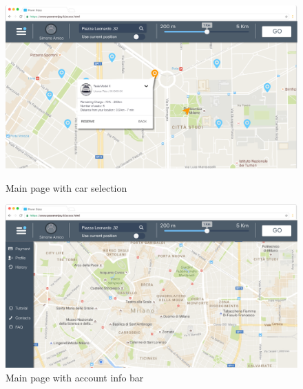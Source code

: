 \documentclass[12pt]{article}
\begin{document}
 	 	\begin{figure}
 	 	 \centering
 	 	 \includegraphics[scale=0.28]{Images/webApp/MainSearchCar.png}
		 \caption{Main page with car selection}
 	 	 \centering
 	 	\includegraphics[scale=0.28]{Images/webApp/MainMenu.png}
		 \caption{Main page with account info bar}
		\end{figure}
		\clearpage
		
		
		
		\FloatBarrier
\end{document}
